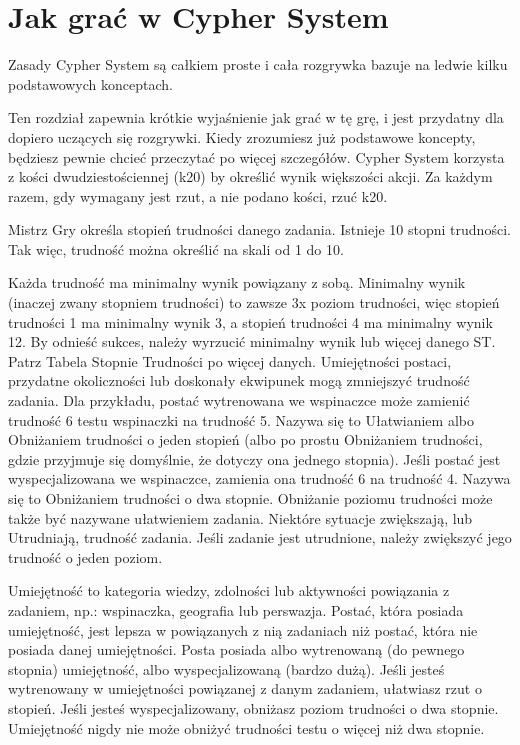 \chapter {Jak grać w Cypher System}

Zasady Cypher System są całkiem proste i cała rozgrywka bazuje na ledwie kilku podstawowych konceptach.

Ten rozdział zapewnia krótkie wyjaśnienie jak grać w tę grę, i jest przydatny dla dopiero uczących się rozgrywki. Kiedy zrozumiesz już podstawowe koncepty, będziesz pewnie chcieć przeczytać  po więcej szczegółów. 
Cypher System korzysta z kości dwudziestościennej (k20) by określić wynik większości akcji. Za każdym razem, gdy wymagany jest rzut, a nie podano kości, rzuć k20.

Mistrz Gry określa stopień trudności danego zadania. Istnieje 10 stopni trudności. Tak więc, trudność można określić na skali od 1 do 10.

Każda trudność ma minimalny wynik powiązany z sobą. Minimalny wynik (inaczej zwany stopniem trudności) to zawsze 3x poziom trudności, więc stopień trudności 1 ma minimalny wynik 3, a stopień trudności 4 ma minimalny wynik 12. By odnieść sukces, należy wyrzucić minimalny wynik lub więcej danego ST. Patrz Tabela Stopnie Trudności po więcej danych.
Umiejętności postaci, przydatne okoliczności lub doskonały ekwipunek mogą zmniejszyć trudność zadania. Dla przykładu, postać wytrenowana we wspinaczce może zamienić trudność 6 testu wspinaczki na trudność 5. Nazywa się to  Ułatwianiem albo Obniżaniem trudności o jeden stopień (albo po prostu Obniżaniem trudności, gdzie przyjmuje się domyślnie, że dotyczy ona jednego stopnia). Jeśli postać jest wyspecjalizowana we wspinaczce, zamienia ona trudność 6 na trudność 4. Nazywa się to Obniżaniem trudności o dwa stopnie. Obniżanie poziomu trudności może także być nazywane ułatwieniem zadania. Niektóre sytuacje zwiększają, lub Utrudniają, trudność zadania. Jeśli zadanie jest utrudnione, należy zwiększyć jego trudność o jeden poziom.

Umiejętność to kategoria wiedzy, zdolności lub aktywności powiązania z zadaniem, np.: wspinaczka, geografia lub perswazja. Postać, która posiada umiejętność, jest lepsza w powiązanych z nią zadaniach niż postać, która nie posiada danej umiejętności. Posta posiada albo wytrenowaną (do pewnego stopnia) umiejętność, albo wyspecjalizowaną (bardzo dużą).
Jeśli jesteś wytrenowany w umiejętności powiązanej z danym zadaniem, ułatwiasz rzut o stopień. Jeśli jesteś wyspecjalizowany, obniżasz poziom trudności o dwa stopnie. Umiejętność nigdy nie może obniżyć trudności testu o więcej niż dwa stopnie. 

